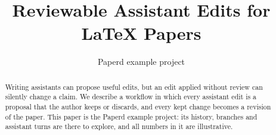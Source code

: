 \documentclass{article}
\title{Reviewable Assistant Edits for \LaTeX{} Papers}
\author{Paperd example project}
\date{}
\begin{document}
\maketitle

\begin{abstract}
Writing assistants can propose useful edits, but an edit applied without review can silently change a claim.
We describe a workflow in which every assistant edit is a proposal that the author keeps or discards, and every kept change becomes a revision of the paper.
This paper is the Paperd example project: its history, branches and assistant turns are there to explore, and all numbers in it are illustrative.
\end{abstract}








\end{document}
